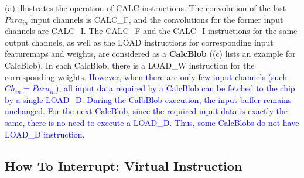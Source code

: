 (a) illustrates the operation of CALC instructions. The convolution of the last $ Para_{in} $ input channels is CALC\_F, and the convolutions for the former input channels are CALC\_I. The CALC\_F and the CALC\_I instructions for the same output channels, as well as the LOAD instructions for corresponding input featuremaps and weights, are considered as a \textbf{CalcBlob}  ((c) lists an example for CalcBlob). In each CalcBlob, there is a LOAD\_W instruction for the corresponding weights. 
\textcolor{blue}{
However, when there are only few input channels (such $Ch_{in} = Para_{in}$), all input data required by a CalcBlob can be fetched to the chip by a single LOAD\_D. 
During the CalbBlob execution, the input buffer remains unchanged. 
For the next CalcBlob, since the required input data is exactly the same, there is no need to execute a LOAD\_D.
Thus, some CalcBlobs do not have  LOAD\_D instruction.
}









\subsection{How To Interrupt: Virtual Instruction}
\label{sec:howinter}

